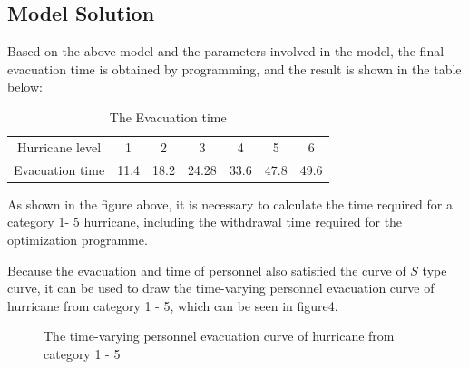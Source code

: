 \documentclass{mcmthesis}
\begin{document}
\subsection{Model Solution}
Based on the above model and the parameters involved in the model, the final evacuation time is obtained by programming, and the result is shown in the table below:
\begin{table}[!htb]
\centering
\setlength{\abovecaptionskip}{0pt}%
\setlength{\belowcaptionskip}{10pt}%
\caption{The Evacuation time}
\begin{tabular}{ccccccc}
\toprule[1.5pt]
Hurricane level &1&2&3&4&5&6\\
Evacuation time &11.4&18.2&24.28&33.6&47.8&49.6\\
\bottomrule[1.5pt]
\end{tabular}
\end{table}



As shown in the figure above, it is necessary to calculate the time required for a category 1- 5 hurricane, including the withdrawal time required for the optimization programme.

Because the evacuation and time of personnel also satisfied the curve of $S$ type curve, it can be used to draw the time-varying personnel evacuation curve of hurricane from category 1 - 5, which can be seen in figure4.

\begin{figure}[h]
  \caption{The time-varying personnel evacuation curve of hurricane from category 1 - 5}\label{figure4}
\end{figure}
\end{document}
